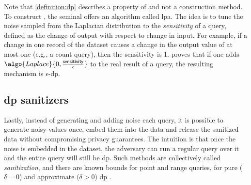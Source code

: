 		Note that \cref{definition:dp} describes a property of  and not a construction method.
		To construct , the seminal \cite{differential-privacy-original} offers an algorithm called \acrfull{lpa}.
		The idea is to tune the noise sampled from the Laplacian distribution to the \emph{sensitivity} of a query, defined as the change of output with respect to change in input.
		For example, if a change in one record of the dataset causes a change in the output value of at most one (e.g., a count query), then the sensitivity is 1.
		\cite{differential-privacy-original} proves that if one adds $\algo{Laplace}{0, \frac{\mathsf{sensitivity}}{\epsilon}}$ to the real result of a query, the resulting mechanism is $\epsilon$-\acrshort{dp}.

		\subsection{\texorpdfstring{\acrshort{dp}}{DP} sanitizers}

			Lastly, instead of generating and adding noise each query, it is possible to generate noisy values once, embed them into the data and release the sanitized data without compromising privacy guarantees.
			The intuition is that once the noise is embedded in the dataset, the adversary can run a regular query over it and the entire query will still be \acrshort{dp}.
			Such methods are collectively called \emph{sanitization}, and there are known bounds for point and range queries, for pure ($\delta = 0$) and approximate ($\delta > 0$) \acrshort{dp} \cite{bounds-on-sample-complexity,private-learning-and-sanitization,non-interactive-database-privacy,dp-under-observation,dp-release,privately-learning-thresholds}.

		\section{\texorpdfstring{}{Trusted Execution Environments}}
